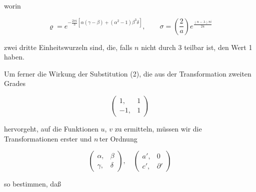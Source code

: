 

worin

\[
\varrho = e^{-\frac{2\pi i}{3}\left[\alpha(\gamma-\beta)+(\alpha^2-1)\beta^3\delta\right]}, \qquad \sigma = \left(\frac{2}{a}\right) e^{\frac{(n-\lambda)\pi i}{24}} %
\]

zwei dritte Einheitswurzeln sind, die, falls $n$ nicht durch 3 teilbar
ist, den Wert 1 haben.

Um ferner die Wirkung der Substitution (2), die aus der
Transformation zweiten Grades

\[
\begin{pmatrix} 1, & 1 \\ -1, & 1 \end{pmatrix}
\]

hervorgeht, auf die Funktionen $u$, $v$ zu ermitteln, müssen wir die
Transformationen erster und $n$\,ter Ordnung

\[
\begin{pmatrix} \alpha, & \beta \\ \gamma, & \delta \end{pmatrix}, \quad \begin{pmatrix} a', & 0 \\ c', & \partial' \end{pmatrix}
\]

so bestimmen, daß

